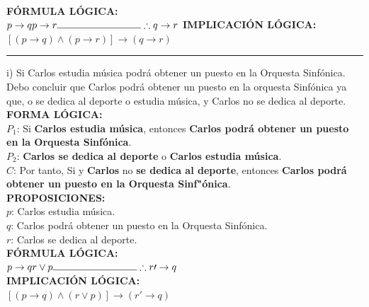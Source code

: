 \documentclass[letterpaper,12pt]{article}
\begin{document}
\begin{sloppypar}
\vspace{0.3cm}\\
\textbf{FÓRMULA LÓGICA:} \\
$p \rightarrow q \\ p \rightarrow r \\ \noindent\rule{3cm}{0.4pt} \\ \therefore q \rightarrow r $
\newpage
\textbf{IMPLICACIÓN LÓGICA:} \\
$[(p \rightarrow q)\wedge(p \rightarrow r)]\rightarrow(q \rightarrow r)$
\vspace{0.3cm} 
\hrule 
\vspace{0.3cm} 
i) Si Carlos estudia música podrá obtener un puesto en la Orquesta Sinfónica. Debo concluir que Carlos podrá obtener un puesto en la orquesta Sinfónica ya que, o se dedica al deporte o estudia música, y Carlos no se
dedica al deporte. 
\vspace{0.3cm} \\
\textbf{FORMA LÓGICA:} \\
$P_1$: Si \textcolor[rgb]{1,0,0}{\textbf{Carlos estudia música}}, entonces \textcolor[rgb]{0.2,0.5,0.7}{\textbf{Carlos podrá obtener un puesto en la Orquesta Sinfónica}}. \\ 
$P_2$: \textcolor[rgb]{0.2,0.7,0.5}{\textbf{Carlos se dedica al deporte}} o \textcolor[rgb]{1,0,0}{\textbf{Carlos estudia música}}. \\ 
$C$: Por tanto, Si  y \textcolor[rgb]{0.2,0.7,0.5}{\textbf{Carlos}} no \textcolor[rgb]{0.2,0.7,0.5}{\textbf{se dedica al deporte}}, entonces \textcolor[rgb]{0.2,0.5,0.7}{\textbf{Carlos podrá obtener un puesto en la Orquesta Sinf"ónica}}. 
\vspace{0.3cm} \\
\textbf{PROPOSICIONES:} \\
$p$: Carlos estudia música. \\ 
$q$: Carlos podrá obtener un puesto en la Orquesta Sinfónica. \\ 
$r$: Carlos se dedica al deporte. 
\vspace{0.3cm} \\
\textbf{FÓRMULA LÓGICA:} \\
$p \rightarrow q \\ r \vee p \\ \noindent\rule{3cm}{0.4pt} \\ \therefore r\prime \rightarrow q$
\vspace{0.3cm} \\
\textbf{IMPLICACIÓN LÓGICA:} \\
$[(p \rightarrow q)\wedge(r \vee p)] \rightarrow ( r\prime \rightarrow q)$

\end{sloppypar}
\end{document}
